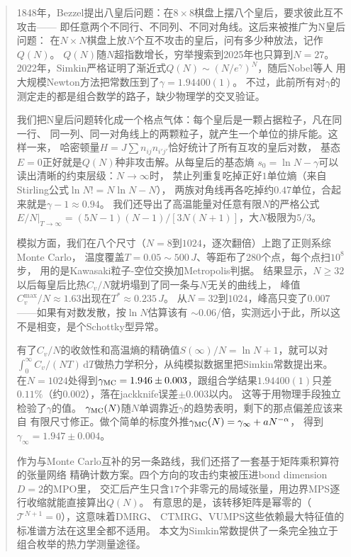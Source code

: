 \begin{abstract}
1848年，Bezzel提出八皇后问题：在$8\times8$棋盘上摆八个皇后，要求彼此互不攻击——
即任意两个不同行、不同列、不同对角线。这后来被推广为N皇后问题：
在$N\times N$棋盘上放$N$个互不攻击的皇后，问有多少种放法，记作$Q(N)$。
$Q(N)$随$N$超指数增长，穷举搜索到2025年也只算到$N=27$。
2022年，Simkin严格证明了渐近式$Q(N)\sim(N/e^\gamma)^N$，随后Nobel等人
用大规模Newton方法把常数压到了$\gamma=1.94400(1)$。
不过，此前所有对$\gamma$的测定走的都是组合数学的路子，缺少物理学的交叉验证。

我们把N皇后问题转化成一个格点气体：每个皇后是一颗占据粒子，凡在同一行、
同一列、同一对角线上的两颗粒子，就产生一个单位的排斥能。这样一来，
哈密顿量$H=J\sum n_{ij}n_{i'j'}$恰好统计了所有互攻的皇后对数，
基态$E=0$正好就是$Q(N)$种非攻击解。从每皇后的基态熵
$s_0=\ln N-\gamma$可以读出清晰的约束层级：$N\to\infty$时，
禁止列重复吃掉正好$1$单位熵（来自Stirling公式$\ln N!=N\ln N-N$），
两族对角线再各吃掉约$0.47$单位，合起来就是$\gamma-1\approx0.94$。
我们还导出了高温能量对任意有限$N$的严格公式
$E/N|_{T\to\infty}=(5N-1)(N-1)/[3N(N+1)]$，大$N$极限为$5/3$。

模拟方面，我们在八个尺寸（$N=8$到$1024$，逐次翻倍）上跑了正则系综Monte Carlo，
温度覆盖$T=0.05\sim500\,J$、等距布了$280$个点，每个点扫$10^8$步，
用的是Kawasaki粒子-空位交换加Metropolis判据。
结果显示，$N\ge32$以后每皇后比热$C_v/N$就坍塌到了同一条与$N$无关的曲线上，
峰值$C_v^{\max}/N\approx1.63$出现在$T^*\approx0.235\,J$。
从$N=32$到$1024$，峰高只变了$0.007$——如果有对数发散，按$\ln N$估算该有
$\sim0.06$/倍，实测远小于此，所以这不是相变，是个Schottky型异常。

有了$C_v/N$的收敛性和高温熵的精确值$S(\infty)/N=\ln N+1$，就可以对
$\int_0^\infty C_v/(NT)\,\mathrm{d}T$做热力学积分，从纯模拟数据里把Simkin常数提出来。
在$N=1024$处得到$\gamma_{\rm MC}=1.946\pm0.003$，跟组合学结果$1.94400(1)$只差
$0.11\%$（约$0.002$），落在jackknife误差$\pm0.003$以内。
这等于用物理手段独立检验了$\gamma$的值。
$\gamma_{\rm MC}(N)$随$N$单调靠近$\gamma$的趋势表明，剩下的那点偏差应该来自
有限尺寸修正。做个简单的标度外推$\gamma_{\rm MC}(N)=\gamma_\infty+aN^{-\alpha}$，
得到$\gamma_\infty=1.947\pm0.004$。

作为与Monte Carlo互补的另一条路线，我们还搭了一套基于矩阵乘积算符的张量网络
精确计数方案。四个方向的攻击约束被压进bond dimension $D=2$的MPO里，
交汇后产生只含$17$个非零元的局域张量，用边界MPS逐行收缩就能直接算出$Q(N)$。
有意思的是，该转移矩阵是幂零的（$\mathcal{T}^{N+1}=0$），这意味着DMRG、
CTMRG、VUMPS这些依赖最大特征值的标准谱方法在这里全都不适用。
本文为Simkin常数提供了一条完全独立于组合枚举的热力学测量途径。
\end{abstract}
